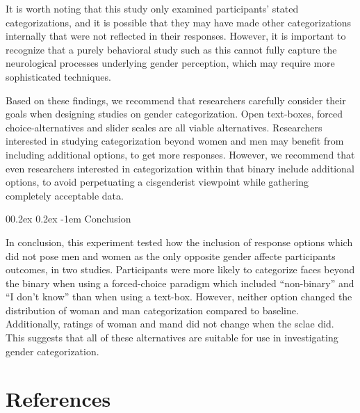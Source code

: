 \documentclass[
  man]{apa7}
\makeatletter
\let\oldparagraph\paragraph
\renewcommand{\paragraph}[1]{\oldparagraph{#1}\mbox{}}
\renewcommand{\paragraph}{\@startsection{paragraph}{4}{\parindent}%
  {0\baselineskip \@plus 0.2ex \@minus 0.2ex}%
  {-1em}%
  {\normalfont\normalsize\bfseries\itshape\typesectitle}}
\renewcommand{\paragraph}{\@startsection{paragraph}{4}{\parindent}%
  {0\baselineskip \@plus 0.2ex \@minus 0.2ex}%
  {-1em}%
  {\normalfont\normalsize\bfseries\typesectitle}}
\makeatother
\begin{document}
It is worth noting that this study only examined participants' stated categorizations, and it is possible that they may have made other categorizations internally that were not reflected in their responses. However, it is important to recognize that a purely behavioral study such as this cannot fully capture the neurological processes underlying gender perception, which may require more sophisticated techniques.

Based on these findings, we recommend that researchers carefully consider their goals when designing studies on gender categorization. Open text-boxes, forced choice-alternatives and slider scales are all viable alternatives. Researchers interested in studying categorization beyond women and men may benefit from including additional options, to get more responses. However, we recommend that even researchers interested in categorization within that binary include additional options, to avoid perpetuating a cisgenderist viewpoint while gathering completely acceptable data.

\hypertarget{conclusion}{%
\paragraph{Conclusion}\label{conclusion}}

In conclusion, this experiment tested how the inclusion of response options which did not pose men and women as the only opposite gender affecte participants outcomes, in two studies. Participants were more likely to categorize faces beyond the binary when using a forced-choice paradigm which included ``non-binary'' and ``I don't know'' than when using a text-box. However, neither option changed the distribution of woman and man categorization compared to baseline. Additionally, ratings of woman and mand did not change when the sclae did. This suggests that all of these alternatives are suitable for use in investigating gender categorization.

\newpage

\hypertarget{references}{%
\section{References}\label{references}}
\end{document}
